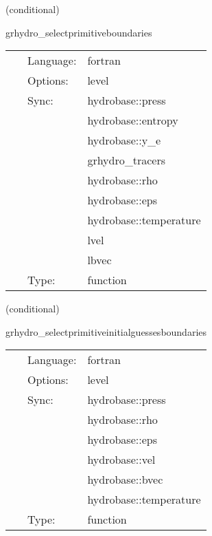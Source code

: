 \vspace{5mm}

   (conditional) 

\hspace{5mm} grhydro\_selectprimitiveboundaries 

\hspace{5mm}{\it select primitive variables for boundary conditions } 


\hspace{5mm}

 \begin{tabular*}{160mm}{cll} 
~ & Language:  & fortran \\ 
~ & Options:  & level \\ 
~ & Sync:  & hydrobase::press \\ 
~& ~ &hydrobase::entropy\\ 
~& ~ &hydrobase::y\_e\\ 
~& ~ &grhydro\_tracers\\ 
~& ~ &hydrobase::rho\\ 
~& ~ &hydrobase::eps\\ 
~& ~ &hydrobase::temperature\\ 
~& ~ &lvel\\ 
~& ~ &lbvec\\ 
~ & Type:  & function \\ 
\end{tabular*} 


\vspace{5mm}

   (conditional) 

\hspace{5mm} grhydro\_selectprimitiveinitialguessesboundaries 

\hspace{5mm}{\it select initial guess primitive variables for boudary conditions } 


\hspace{5mm}

 \begin{tabular*}{160mm}{cll} 
~ & Language:  & fortran \\ 
~ & Options:  & level \\ 
~ & Sync:  & hydrobase::press \\ 
~& ~ &hydrobase::rho\\ 
~& ~ &hydrobase::eps\\ 
~& ~ &hydrobase::vel\\ 
~& ~ &hydrobase::bvec\\ 
~& ~ &hydrobase::temperature\\ 
~ & Type:  & function \\ 
\end{tabular*} 


